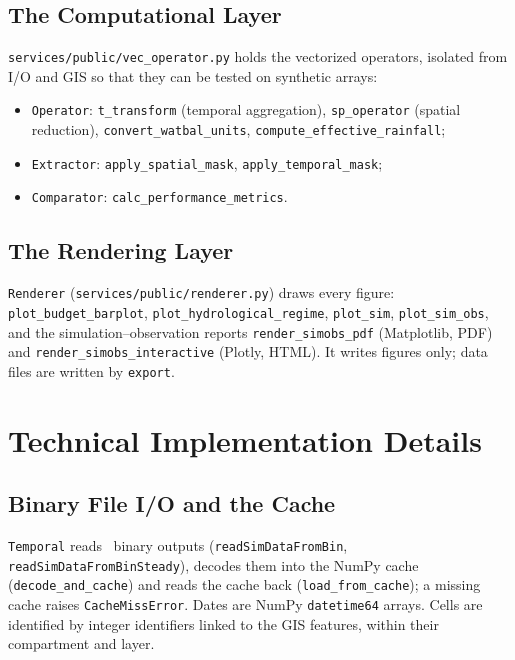 \subsection{The Computational Layer}

\texttt{services/public/vec\_operator.py} holds the vectorized operators,
isolated from I/O and GIS so that they can be tested on synthetic arrays:

\begin{itemize}
    \item \texttt{Operator}: \texttt{t\_transform} (temporal aggregation), \texttt{sp\_operator} (spatial reduction), \texttt{convert\_watbal\_units}, \texttt{compute\_effective\_rainfall};
    \item \texttt{Extractor}: \texttt{apply\_spatial\_mask}, \texttt{apply\_temporal\_mask};
    \item \texttt{Comparator}: \texttt{calc\_performance\_metrics}.
\end{itemize}

\subsection{The Rendering Layer}

\texttt{Renderer} (\texttt{services/public/renderer.py}) draws every figure:
\texttt{plot\_budget\_barplot}, \texttt{plot\_hydrological\_regime},
\texttt{plot\_sim}, \texttt{plot\_sim\_obs}, and the simulation--observation
reports \texttt{render\_simobs\_pdf} (Matplotlib, PDF) and
\texttt{render\_simobs\_interactive} (Plotly, HTML). It writes figures only;
data files are written by \texttt{export}.


\section{Technical Implementation Details}

\subsection{Binary File I/O and the Cache}

\texttt{Temporal} reads \cw\ binary outputs (\texttt{readSimDataFromBin},
\texttt{readSimDataFromBinSteady}), decodes them into the NumPy cache
(\texttt{decode\_and\_cache}) and reads the cache back
(\texttt{load\_from\_cache}); a missing cache raises \texttt{CacheMissError}.
Dates are NumPy \texttt{datetime64} arrays. Cells are identified by integer
identifiers linked to the GIS features, within their compartment and layer.

